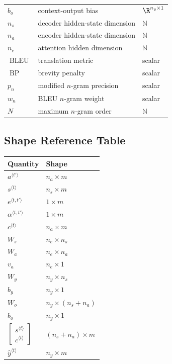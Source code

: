 \begin{center}
\begin{tabular}{lll}
$b_o$ & context-output bias & $\R^{n_y \times 1}$ \\
$n_s$ & decoder hidden-state dimension & $\mathbb{N}$ \\
$n_a$ & encoder hidden-state dimension & $\mathbb{N}$ \\
$n_e$ & attention hidden dimension & $\mathbb{N}$ \\
$\operatorname{BLEU}$ & translation metric & scalar \\
$\operatorname{BP}$ & brevity penalty & scalar \\
$p_n$ & modified $n$-gram precision & scalar \\
$w_n$ & BLEU $n$-gram weight & scalar \\
$N$ & maximum $n$-gram order & $\mathbb{N}$ \\
\bottomrule
\end{tabular}
\end{center}

\subsection{Shape Reference Table}

\begin{center}
\begin{tabular}{ll}
\toprule
Quantity & Shape \\
\midrule
$a^{\langle t'\rangle}$ & $n_a \times m$ \\
$s^{\langle t\rangle}$ & $n_s \times m$ \\
$e^{\langle t,t'\rangle}$ & $1 \times m$ \\
$\alpha^{\langle t,t'\rangle}$ & $1 \times m$ \\
$c^{\langle t\rangle}$ & $n_a \times m$ \\
$W_s$ & $n_e \times n_s$ \\
$W_a$ & $n_e \times n_a$ \\
$v_a$ & $n_e \times 1$ \\
$W_y$ & $n_y \times n_s$ \\
$b_y$ & $n_y \times 1$ \\
$W_o$ & $n_y \times (n_s+n_a)$ \\
$b_o$ & $n_y \times 1$ \\
$\begin{bmatrix}s^{\langle t\rangle}\\ c^{\langle t\rangle}\end{bmatrix}$ & $(n_s+n_a) \times m$ \\
$\hat{y}^{\langle t\rangle}$ & $n_y \times m$ \\
\bottomrule
\end{tabular}
\end{center}
